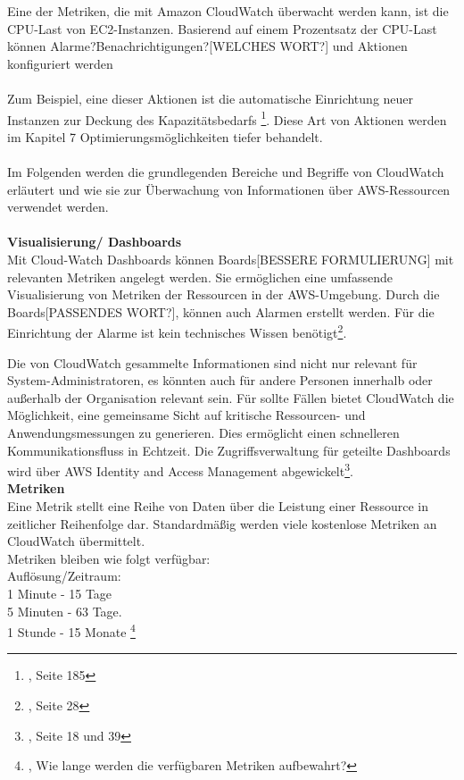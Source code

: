 Eine der Metriken, die mit Amazon CloudWatch überwacht werden kann, ist die CPU-Last von EC2-Instanzen.
Basierend auf einem Prozentsatz der CPU-Last können Alarme?Benachrichtigungen?[WELCHES WORT?] und Aktionen konfiguriert werden
\\\\
Zum Beispiel, eine dieser Aktionen ist die automatische Einrichtung neuer Instanzen zur Deckung des Kapazitätsbedarfs
\footnote{\cite{AWS1}, Seite 185}.
Diese Art von Aktionen werden im Kapitel 7 Optimierungsmöglichkeiten tiefer behandelt.
\\\\
Im Folgenden werden die grundlegenden Bereiche und Begriffe von CloudWatch erläutert und wie sie zur Überwachung von Informationen über AWS-Ressourcen verwendet werden.
\\\\
\textbf{Visualisierung/ Dashboards}\\
Mit Cloud-Watch Dashboards können Boards[BESSERE FORMULIERUNG] mit relevanten Metriken angelegt werden. Sie ermöglichen eine umfassende Visualisierung von Metriken der Ressourcen in der AWS-Umgebung. Durch die Boards[PASSENDES WORT?], können auch Alarmen erstellt werden. Für die Einrichtung der Alarme ist kein technisches Wissen benötigt\footnote{\cite{AMZ14}, Seite 28}.

Die von CloudWatch gesammelte Informationen sind nicht nur relevant für System-Administratoren, es könnten auch für andere Personen innerhalb oder außerhalb der Organisation relevant sein.
Für sollte Fällen bietet CloudWatch die Möglichkeit, eine gemeinsame Sicht auf kritische Ressourcen- und Anwendungsmessungen zu generieren.
Dies ermöglicht einen schnelleren Kommunikationsfluss in Echtzeit. Die Zugriffsverwaltung für geteilte Dashboards wird über AWS Identity and Access Management abgewickelt\footnote{\cite{AMZ14}, Seite 18 und 39}.
\\

\textbf{Metriken} \\
Eine Metrik stellt eine Reihe von Daten über die Leistung einer Ressource in zeitlicher Reihenfolge dar. Standardmäßig werden viele kostenlose Metriken an CloudWatch übermittelt.
\\
Metriken bleiben wie folgt verfügbar:\\
Auflösung/Zeitraum: \\
1 Minute - 15 Tage\\
5 Minuten - 63 Tage.\\
1 Stunde - 15 Monate
\footnote{\cite{AMZ15}, Wie lange werden die verfügbaren Metriken aufbewahrt?}
 
